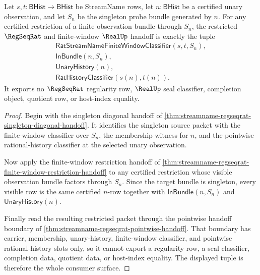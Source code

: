 \begin{theorem}
\label{thm:streamname-singleton-restriction-handoff-exactness}
Let $s,t:\mathsf{BHist}\to\mathsf{BHist}$ be StreamName rows, let
$n:\mathsf{BHist}$ be a certified unary observation, and let $S_n$ be the
singleton probe bundle generated by $n$. For any certified restriction of a
finite observation bundle through $S_n$, the restricted $\RegSeqRat$ and
finite-window $\RealUp$ handoff is exactly the tuple
$$
\begin{gathered}
\mathsf{RatStreamNameFiniteWindowClassifier}(s,t,S_n),\\
\mathsf{InBundle}(n,S_n),\\
\mathsf{UnaryHistory}(n),\\
\mathsf{RatHistoryClassifier}(s(n),t(n)).
\end{gathered}
$$
It exports no $\RegSeqRat$ regularity row, $\RealUp$ seal classifier,
completion object, quotient row, or host-index equality.
\end{theorem}
\begin{proof}
Begin with the singleton diagonal handoff of
\autoref{thm:streamname-regseqrat-singleton-diagonal-handoff}. It identifies
the singleton source packet with the finite-window classifier over $S_n$, the
membership witness for $n$, and the pointwise rational-history classifier at
the selected unary observation.

Now apply the finite-window restriction handoff of
\autoref{thm:streamname-regseqrat-finite-window-restriction-handoff} to any
certified restriction whose visible observation bundle factors through
$S_n$. Since the target bundle is singleton, every visible row is the same
certified $n$-row together with $\mathsf{InBundle}(n,S_n)$ and
$\mathsf{UnaryHistory}(n)$.

Finally read the resulting restricted packet through the pointwise handoff
boundary of \autoref{thm:streamname-regseqrat-pointwise-handoff}. That
boundary has carrier, membership, unary-history, finite-window classifier,
and pointwise rational-history slots only, so it cannot export a regularity
row, a seal classifier, completion data, quotient data, or host-index
equality. The displayed tuple is therefore the whole consumer surface.
\end{proof}

